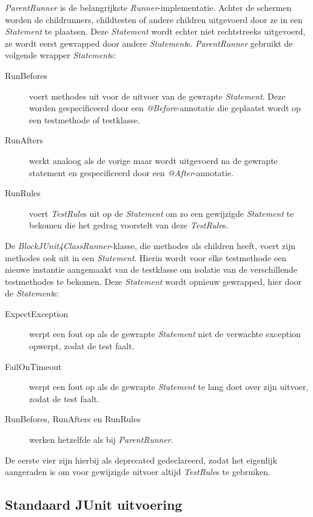 \documentclass[i1]{oss}
\begin{document}
\emph{ParentRunner} is de belangrijkste \emph{Runner}-implementatie. Achter de schermen worden de childrunners, childtesten of andere children uitgevoerd door ze in een \emph{Statement} te plaatsen. Deze \emph{Statement} wordt echter niet rechtstreeks uitgevoerd, ze wordt eerst gewrapped door andere \emph{Statement}s. \emph{ParentRunner} gebruikt de volgende wrapper \emph{Statement}s:

\begin{description}
\item[RunBefores] voert methodes uit voor de uitvoer van de gewrapte \emph{Statement}. Deze worden gespecificeerd door een \emph{@Before}-annotatie die geplaatst wordt op een testmethode of testklasse.
\item[RunAfters] werkt analoog als de vorige maar wordt uitgevoerd na de gewrapte statement en gespecificeerd door een \emph{@After}-annotatie.
\item[RunRules] voert \emph{TestRule}s uit op de \emph{Statement} om zo een gewijzigde \emph{Statement} te bekomen die het gedrag voorstelt van deze \emph{TestRule}s.
\end{description}

De \emph{BlockJUnit4ClassRunner}-klasse, die methodes als children heeft, voert zijn methodes ook uit in een \emph{Statement}. Hierin wordt voor elke testmethode een nieuwe instantie aangemaakt van de testklasse om isolatie van de verschillende testmethodes te bekomen. Deze \emph{Statement} wordt opnieuw gewrapped, hier door de \emph{Statement}s:

\begin{description}
\item[ExpectException] werpt een fout op als de gewrapte \emph{Statement} niet de verwachte exception opwerpt, zodat de test faalt.
\item[FailOnTimeout] werpt een fout op als de gewrapte \emph{Statement} te lang doet over zijn uitvoer, zodat de test faalt.
\item[RunBefores, RunAfters en RunRules] werken hetzelfde als bij \emph{ParentRunner}.
\end{description}

De eerste vier zijn hierbij als deprecated gedeclareerd, zodat het eigenlijk aangeraden is om voor gewijzigde uitvoer altijd \emph{TestRule}s te gebruiken.


\subsection{Standaard JUnit uitvoering}
\end{document}
